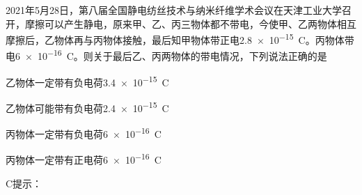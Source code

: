 2021年5月28日，第八届全国静电纺丝技术与纳米纤维学术会议在天津工业大学召开，摩擦可以产生静电，原来甲、乙、丙三物体都不带电，今使甲、乙两物体相互摩擦后，乙物体再与丙物体接触，最后知甲物体带正电\qty{2.8e-15}{C}。丙物体带电\qty{6e-16}{C}。则关于最后乙、丙两物体的带电情况，下列说法正确的是\paren[]
\begin{choices}
	\item 乙物体一定带有负电荷\qty{3.4e-15}{C}
	\item 乙物体可能带有负电荷\qty{2.4e-15}{C}
	\item 丙物体一定带有负电荷\qty{6e-16}{C}
	\item 丙物体一定带有正电荷\qty{6e-16}{C}
\end{choices}
\begin{answer}
	C\qquad 提示：
\end{answer}